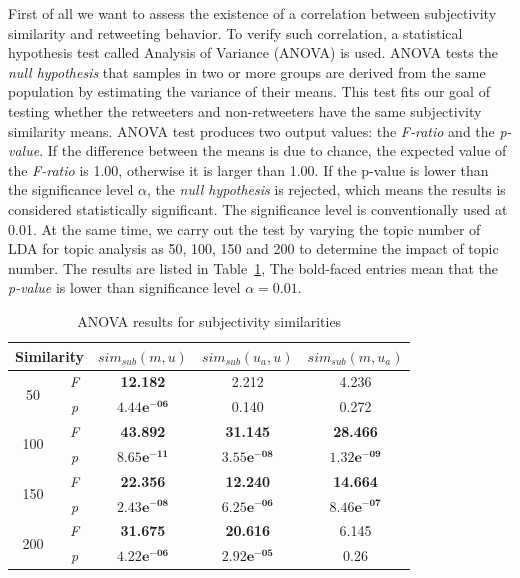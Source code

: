 \documentclass{acm_proc_article-sp}
\begin{document}
First of all we want to assess the existence of a correlation between subjectivity similarity and retweeting behavior. 
To verify such correlation, a statistical hypothesis test called Analysis of Variance (ANOVA) \cite{fisher1970statistical} is used. 
ANOVA tests the \textit{null hypothesis} that samples in two or more groups are derived from the same population by estimating the variance of their means. 
This test fits our goal of testing whether the retweeters and non-retweeters have the same subjectivity similarity means. 
ANOVA test produces two output values: the \textit{F-ratio} and the \textit{p-value}. 
If the difference between the means is due to chance, the expected value of the \textit{F-ratio} is 1.00, otherwise it is larger than 1.00. 
If the p-value is lower than the significance level $ \alpha $, the \textit{null hypothesis} is rejected, which means the results is considered statistically significant. 
The significance level is conventionally used at 0.01.
At the same time, we carry out the test by varying the topic number of LDA for topic analysis as 50, 100, 150 and 200 to determine the impact of topic number. 
The results are listed in Table~\ref{tab2}, The bold-faced entries mean that the \textit{p-value} is lower than significance level $ \alpha = 0.01 $.
\begin{table}[htb]
\scriptsize
\centering
\caption{ANOVA results for subjectivity similarities}
\label{tab2}
\begin{tabular}{|c|c|c|c|c|}
\hline
\multicolumn{2}{|c|}{Similarity}& $ sim_{sub} \left( m,u \right) $ & $ sim_{sub}\left( u_{a},u \right)  $ & $ sim_{sub}\left( m,u_{a} \right)  $\\
\hline
\multirow{2}{*}{50} & \textit{F} & \textbf{12.182} & 2.212 & 4.236 \\
\cline{2-5}
  & \textit{p} &  $\mathbf{4.44e^{-06}}$  & 0.140 & 0.272\\
\hline
\multirow{2}{*}{100} & \textit{F} & \textbf{43.892} & \textbf{31.145} & \textbf{28.466} \\
\cline{2-5}
  & \textit{p} &  $\mathbf{8.65e^{-11}}$  & $\mathbf{3.55e^{-08}}$ & $\mathbf{1.32e^{-09}}$\\
\hline
\multirow{2}{*}{150} & \textit{F} & \textbf{22.356} & \textbf{12.240} & \textbf{14.664} \\
\cline{2-5}
  & \textit{p} &  $\mathbf{2.43e^{-08}}$  & $\mathbf{6.25e^{-06}}$ & $\mathbf{8.46e^{-07}}$\\
\hline
\multirow{2}{*}{200} & \textit{F} & \textbf{31.675} & \textbf{20.616} & 6.145\\
\cline{2-5}
  & \textit{p} &  $\mathbf{4.22e^{-06}}$  & $\mathbf{2.92e^{-05}}$ & 0.26\\
\hline
\end{tabular}
\end{table}
\end{document}
